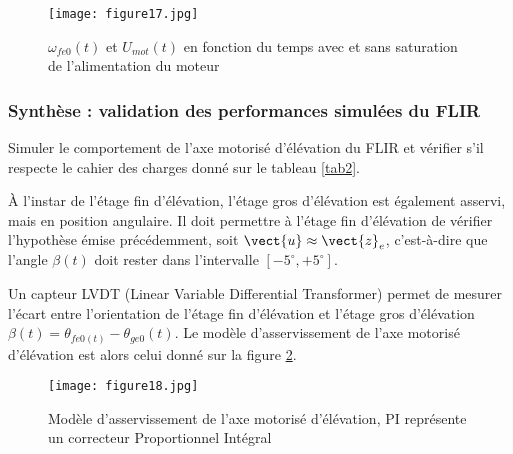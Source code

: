 \begin{figure}[!htb]
\begin{center}
\texttt{[image: figure17.jpg]}
\caption{$\omega_{fe0}(t)$ et $U_{mot}(t)$ en fonction du temps avec et sans saturation de l'alimentation du moteur\label{fig17}}
\end{center}
\end{figure}


\subsubsection{Synthèse : validation des performances simulées du FLIR}

\begin{obj}
Simuler le comportement de l'axe motorisé d'élévation du FLIR et vérifier s'il respecte le cahier des
charges donné sur le tableau \ref{tab2}.
\end{obj}

À l'instar de l'étage fin d'élévation, l'étage gros d'élévation est également asservi, mais en position angulaire. Il
doit permettre à l'étage fin d'élévation de vérifier l'hypothèse émise précédemment, soit $\vect{u}\approx \vect{z}_e$, c'est-à-dire que l'angle $\beta(t)$ doit rester dans l'intervalle $\left[-5^{\circ}, +5^{\circ}\right]$.

Un capteur LVDT (Linear Variable Differential Transformer) permet de mesurer l'écart entre l'orientation de
l'étage fin d'élévation et l'étage gros d'élévation $\beta(t)=\theta_{fe0(t)}-\theta_{ge0}(t)$. Le modèle d'asservissement de l'axe
motorisé d'élévation est alors celui donné sur la figure \ref{fig18}.


\begin{figure}[!htb]
\begin{center}
\texttt{[image: figure18.jpg]}
\caption{Modèle d'asservissement de l'axe motorisé d'élévation, PI représente un correcteur Proportionnel
Intégral \label{fig18}}
\end{center}
\end{figure}

